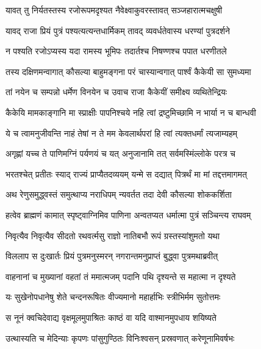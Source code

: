 
\twolineshloka
{यावत् तु निर्यतस्तस्य रजोरूपमदृश्यत}
{नैवेक्ष्वाकुवरस्तावत् सञ्जहारात्मचक्षुषी} %

\twolineshloka
{यावद् राजा प्रियं पुत्रं पश्यत्यत्यन्तधार्मिकम्}
{तावद् व्यवर्धतेवास्य धरण्यां पुत्रदर्शने} %

\twolineshloka
{न पश्यति रजोऽप्यस्य यदा रामस्य भूमिपः}
{तदार्तश्च निषण्णश्च पपात धरणीतले} %

\twolineshloka
{तस्य दक्षिणमन्वागात् कौसल्या बाहुमङ्गना}
{परं चास्यान्वगात् पार्श्वं कैकेयी सा सुमध्यमा} %

\twolineshloka
{तां नयेन च सम्पन्नो धर्मेण विनयेन च}
{उवाच राजा कैकेयीं समीक्ष्य व्यथितेन्द्रियः} %

\twolineshloka
{कैकेयि मामकाङ्गानि मा स्प्राक्षीः पापनिश्चये}
{नहि त्वां द्रष्टुमिच्छामि न भार्या न च बान्धवी} %

\twolineshloka
{ये च त्वामनुजीवन्ति नाहं तेषां न ते मम}
{केवलार्थपरां हि त्वां त्यक्तधर्मां त्यजाम्यहम्} %

\twolineshloka
{अगृह्णां यच्च ते पाणिमग्निं पर्यणयं च यत्}
{अनुजानामि तत् सर्वमस्मिंल्लोके परत्र च} %

\twolineshloka
{भरतश्चेत् प्रतीतः स्याद् राज्यं प्राप्यैतदव्ययम्}
{यन्मे स दद्यात् पित्रर्थं मा मां तद्दत्तमागमत्} %

\twolineshloka
{अथ रेणुसमुद्ध्वस्तं समुत्थाप्य नराधिपम्}
{न्यवर्तत तदा देवी कौसल्या शोककर्शिता} %

\twolineshloka
{हत्वेव ब्राह्मणं कामात् स्पृष्ट्वाग्निमिव पाणिना}
{अन्वतप्यत धर्मात्मा पुत्रं सञ्चिन्त्य राघवम्} %

\twolineshloka
{निवृत्यैव निवृत्यैव सीदतो रथवर्त्मसु}
{राज्ञो नातिबभौ रूपं ग्रस्तस्यांशुमतो यथा} %

\twolineshloka
{विललाप स दुःखार्तः प्रियं पुत्रमनुस्मरन्}
{नगरान्तमनुप्राप्तं बुद्ध्वा पुत्रमथाब्रवीत्} %

\twolineshloka
{वाहनानां च मुख्यानां वहतां तं ममात्मजम्}
{पदानि पथि दृश्यन्ते स महात्मा न दृश्यते} %

\twolineshloka
{यः सुखेनोपधानेषु शेते चन्दनरूषितः}
{वीज्यमानो महार्हाभिः स्त्रीभिर्मम सुतोत्तमः} %

\twolineshloka
{स नूनं क्वचिदेवाद्य वृक्षमूलमुपाश्रितः}
{काष्ठं वा यदि वाश्मानमुपधाय शयिष्यते} %

\twolineshloka
{उत्थास्यति च मेदिन्याः कृपणः पांसुगुण्ठितः}
{विनिःश्वसन् प्रस्रवणात् करेणूनामिवर्षभः} %


